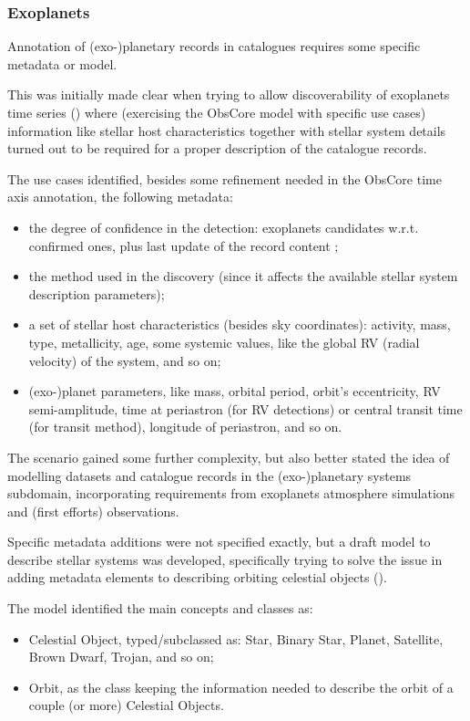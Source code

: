 \documentclass[11pt,a4paper]{ivoa}
\begin{document}
\subsubsection{Exoplanets}
Annotation of (exo-)planetary records in catalogues requires some
specific metadata or model. 

This was initially made clear when trying to
allow discoverability of exoplanets time series
(\cite{2020ASPC..522..703M}) where (exercising the
ObsCore model with specific use cases) information like stellar host
characteristics together with stellar system details turned out to be required for a
proper description of the catalogue records. 

The use cases identified,
besides some refinement needed in the ObsCore time axis annotation, the
following metadata:
\begin{itemize}
	\item the degree of confidence in the detection: exoplanets candidates
w.r.t. confirmed ones, plus last update of the record content ;
	\item the method used in the discovery (since it affects the available
stellar system description parameters);
	\item a set of stellar host characteristics (besides sky coordinates): 
activity, mass, type,
metallicity, age, some systemic values, like the global RV (radial
velocity) of the system, and so on;
	\item (exo-)planet parameters, like mass, orbital period, orbit's
eccentricity, RV semi-amplitude, time at periastron (for RV detections)
or central transit time (for transit method), longitude of periastron,
and so on.
\end{itemize}

The scenario gained some further complexity, but also better stated the
idea of modelling datasets and catalogue records in the (exo-)planetary
systems subdomain, incorporating requirements from exoplanets atmosphere
simulations and (first efforts) observations. 

Specific metadata additions were not specified exactly, but a draft model
to describe stellar systems was developed, specifically trying to solve
the issue in adding metadata elements to describing orbiting celestial
objects (\cite{2019ASPC..523..597M}).

The model identified the main concepts and classes as:
\begin{itemize}
	\item Celestial Object, typed/subclassed as: Star, Binary Star,
Planet, Satellite, Brown Dwarf, Trojan, and so on;
	\item Orbit, as the class keeping the information needed to describe
the orbit of a couple (or more) Celestial Objects.
\end{itemize}
\end{document}
